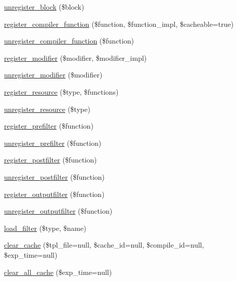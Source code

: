 \begin{DoxyCompactItemize}
\item 
\mbox{\hyperlink{class_smarty_aa27d55eff4bc63b71da604fb1af362c9}{unregister\+\_\+block}} (\$block)
\item 
\mbox{\hyperlink{class_smarty_a4b141e0b9a699098e8986aca16e871ca}{register\+\_\+compiler\+\_\+function}} (\$function, \$function\+\_\+impl, \$cacheable=true)
\item 
\mbox{\hyperlink{class_smarty_a85920043d6bf2ee895a1dc3fa2c464ca}{unregister\+\_\+compiler\+\_\+function}} (\$function)
\item 
\mbox{\hyperlink{class_smarty_ac1483efc4d74e159c9ddb29b33fbfcc0}{register\+\_\+modifier}} (\$modifier, \$modifier\+\_\+impl)
\item 
\mbox{\hyperlink{class_smarty_aa0efdcad7fc5a36846e5e8bd8a455dd9}{unregister\+\_\+modifier}} (\$modifier)
\item 
\mbox{\hyperlink{class_smarty_a27683a72840c9401cde24eec57d493df}{register\+\_\+resource}} (\$type, \$functions)
\item 
\mbox{\hyperlink{class_smarty_a509d4408ce20f6def85118984b81a32e}{unregister\+\_\+resource}} (\$type)
\item 
\mbox{\hyperlink{class_smarty_afdd4dead058273890d629d207f236239}{register\+\_\+prefilter}} (\$function)
\item 
\mbox{\hyperlink{class_smarty_a8208fd226842f48de08ce37305295d64}{unregister\+\_\+prefilter}} (\$function)
\item 
\mbox{\hyperlink{class_smarty_a1eb31d2b852e5862a3d04284614d145b}{register\+\_\+postfilter}} (\$function)
\item 
\mbox{\hyperlink{class_smarty_a36d917f9b975efc48682198c705eb244}{unregister\+\_\+postfilter}} (\$function)
\item 
\mbox{\hyperlink{class_smarty_a54426aae9228293c47e05f4ceaacd516}{register\+\_\+outputfilter}} (\$function)
\item 
\mbox{\hyperlink{class_smarty_a8d7427d8dc5f3d71aeb3385b9aad3700}{unregister\+\_\+outputfilter}} (\$function)
\item 
\mbox{\hyperlink{class_smarty_ad642cca94486c492c56071fb32a3421c}{load\+\_\+filter}} (\$type, \$name)
\item 
\mbox{\hyperlink{class_smarty_a6b5412f074996dea92d89b32a13880d8}{clear\+\_\+cache}} (\$tpl\+\_\+file=null, \$cache\+\_\+id=null, \$compile\+\_\+id=null, \$exp\+\_\+time=null)
\item 
\mbox{\hyperlink{class_smarty_aaf1eab6e680746ae852abfc3814382fb}{clear\+\_\+all\+\_\+cache}} (\$exp\+\_\+time=null)

\end{DoxyCompactItemize}

